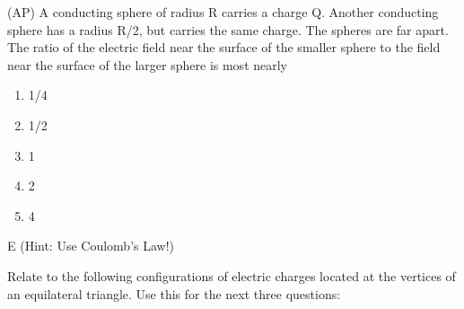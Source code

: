 \begin{question}
(AP) A conducting sphere of radius R carries a charge Q.  Another conducting sphere has a radius R/2, but carries the same charge.  The spheres are far apart.  The ratio of the electric field near the surface of the smaller sphere to the field near the surface of the larger sphere is most nearly

\begin{multicols}{5}
\begin{enumerate}[label=(\alph*)]
    \item 1/4
    \item 1/2
    \item 1
    \item 2
    \item 4
\end{enumerate}
\end{multicols}

\end{question}

\begin{solution}
E (Hint: Use Coulomb's Law!)
\end{solution}

\newpage
Relate to the following configurations of electric charges located at the vertices of an equilateral triangle. Use this for the next three questions:






